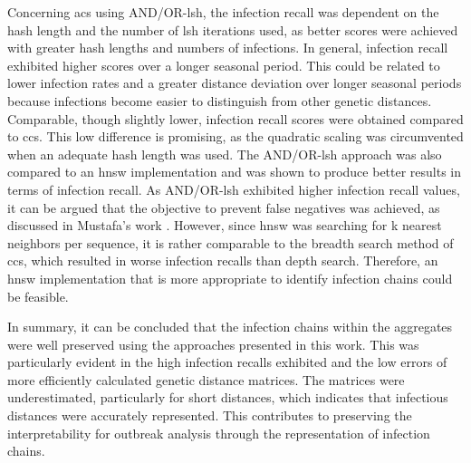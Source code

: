 Concerning \acrshort{acs} using AND/OR-\acrshort{lsh}, the infection recall was dependent on the hash length and the number of \acrshort{lsh} iterations used, as better scores were achieved with greater hash lengths and numbers of infections. In general, infection recall exhibited higher scores over a longer seasonal period. This could be related to lower infection rates and a greater distance deviation over longer seasonal periods because infections become easier to distinguish from other genetic distances.
Comparable, though slightly lower, infection recall scores were obtained compared to \acrshort{ccs}. This low difference is promising, as the quadratic scaling was circumvented when an adequate hash length was used. The AND/OR-\acrshort{lsh} approach was also compared to an \acrshort{hnsw} implementation and was shown to produce better results in terms of infection recall. As AND/OR-\acrshort{lsh} exhibited higher infection recall values, it can be argued that the objective to prevent false negatives was achieved, as discussed in Mustafa's work \cite{Mus1}.  However, since \acrshort{hnsw} was searching for k nearest neighbors per sequence, it is rather comparable to the breadth search method of \acrshort{ccs}, which resulted in worse infection recalls than depth search. Therefore, an \acrshort{hnsw} implementation that is more appropriate to identify infection chains could be feasible.

In summary, it can be concluded that the infection chains within the aggregates were well preserved using the approaches presented in this work. This was particularly evident in the high infection recalls exhibited and the low errors of more efficiently calculated genetic distance matrices. The matrices were underestimated, particularly for short distances, which indicates that infectious distances were accurately represented. This contributes to preserving the interpretability for outbreak analysis through the representation of infection chains.

